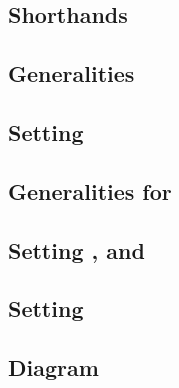 \subsection{Shorthands}                                                                                                \label{bls: shorthands}                                         
\subsection{Generalities}                                                                                              \label{bls: generalities for malformed and wellformed}          
\subsection{Setting \malformedDataInternalJustification{}}                                                             \label{bls: malformed data internal justification}              
\subsection{Generalities for \pairOfPointsContainsInfinity{}}                                                          \label{bls: generalities for pair of points contains infinity}  
\subsection{Setting \malformedDataExternalBit, \malformedDataExternalAcc{} and \malformedDataExternalJustification}    \label{bls: malformed bit acc justification}                    
\subsection{Setting \trivialAcc{}}                                                                                     \label{bls: setting trivial}                                    
\subsection{Diagram}                                                                                                   \label{bls: setting diagrams}                                   
